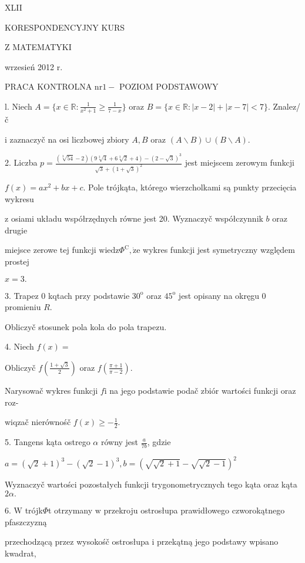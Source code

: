 \documentclass[a4paper,12pt]{article}
\begin{document}
XLII

KORESPONDENCYJNY KURS

Z MATEMATYKI

wrzesień 2012 r.

PRACA KONTROLNA $\mathrm{n}\mathrm{r} 1 -$ POZIOM PODSTAWOWY

l. Niech $A=\displaystyle \{x\in \mathbb{R}:\frac{1}{x^{2}+1}\geq\frac{1}{7-x}\}$ oraz $B=\{x\in \mathbb{R}:|x-2|+|x-7|<7\}$. Znalez/č

$\mathrm{i}$ zaznaczyč na osi liczbowej zbiory $A, B$ oraz $(A\backslash B)\cup(B\backslash A).$

2. Liczba $p=\displaystyle \frac{(\sqrt[3]{54}-2)(9\sqrt[3]{4}+6\sqrt[3]{2}+4)-(2-\sqrt{3})^{3}}{\sqrt{3}+(1+\sqrt{3})^{2}}$ jest miejscem zerowym funkcji

$f(x)=ax^{2}+bx+c$. Pole trójkąta, którego wierzcholkami są punkty przecięcia wykresu

$\mathrm{z}$ osiami układu współrzędnych równe jest 20. Wyznaczyč współczynnik $b$ oraz drugie

miejsce zerowe tej funkcji $\mathrm{w}\mathrm{i}\mathrm{e}\mathrm{d}\mathrm{z}\Phi^{\mathrm{C}}, \dot{\mathrm{z}}\mathrm{e}$ wykres funkcji jest symetryczny względem prostej

$x=3.$

3. Trapez $0$ kqtach przy podstawie $30^{\mathrm{o}}$ oraz $45^{\mathrm{o}}$ jest opisany na okręgu $0$ promieniu $R.$

Obliczyč stosunek pola kola do pola trapezu.

4. Niech $f(x)=$

Obliczyč $f(\displaystyle \frac{1+\sqrt{3}}{2})$ oraz $f(\displaystyle \frac{\pi+1}{\pi-2}).$

Narysowač wykres funkcji $f\mathrm{i}$ na jego podstawie podač zbiór wartości funkcji oraz roz-

wiqzač nierównośč $f(x)\displaystyle \geq-\frac{1}{2}.$

5. Tangens kąta ostrego $\alpha$ równy jest $\displaystyle \frac{a}{7b}$, gdzie

$a=(\sqrt{2}+1)^{3}-(\sqrt{2}-1)^{3},b=(\sqrt{\sqrt{2}+1}-\sqrt{\sqrt{2}-1})^{2}$

Wyznaczyč wartości pozostałych funkcji trygonometrycznych tego kąta oraz kąta $2\alpha.$

6. $\mathrm{W}$ trójk$\Phi$t otrzymany $\mathrm{w}$ przekroju ostrosłupa prawidłowego czworokątnego pfaszczyzną

przechodzącą przez wysokośč ostrosłupa $\mathrm{i}$ przekątną jego podstawy wpisano kwadrat,
\end{document}
